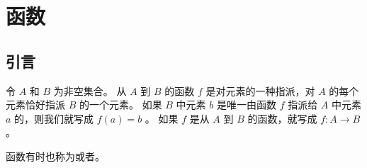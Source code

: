 
\section{函数}
{
    \subsection{引言}
    {
        \begin{defines}
            令 $A$ 和 $B$ 为非空集合。
            从 $A$ 到 $B$ 的函数 $f$ 是对元素的一种指派，对 $A$ 的每个元素恰好指派 $B$ 的一个元素。
            如果 $B$ 中元素 $b$ 是唯一由函数 $f$ 指派给 $A$ 中元素 $a$ 的，则我们就写成 $f(a) = b$ 。
            如果 $f$ 是从 $A$ 到 $B$ 的函数，就写成 $f: A \rightarrow B$ 。
        \end{defines}

        \begin{defines}
            函数有时也称为或者。
        \end{defines}
    }
}
